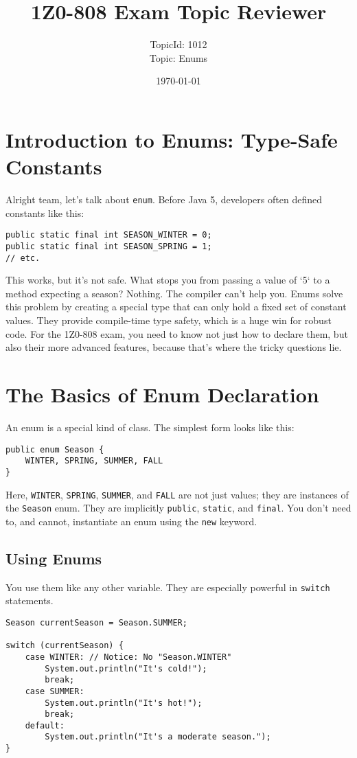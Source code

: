 \documentclass[12pt]{article}
\title{\textbf{1Z0-808 Exam Topic Reviewer}}
\author{TopicId: 1012 \\ Topic: Enums}
\date{\today}
\begin{document}
\maketitle
\newpage\begin{enumerate}[label=(\arabic*)]
\section*{Introduction to Enums: Type-Safe Constants}
Alright team, let's talk about \texttt{enum}. Before Java 5, developers often defined constants like this:
\begin{verbatim}
public static final int SEASON_WINTER = 0;
public static final int SEASON_SPRING = 1;
// etc.
\end{verbatim}
This works, but it's not safe. What stops you from passing a value of `5` to a method expecting a season? Nothing. The compiler can't help you. Enums solve this problem by creating a special type that can only hold a fixed set of constant values. They provide compile-time type safety, which is a huge win for robust code. For the 1Z0-808 exam, you need to know not just how to declare them, but also their more advanced features, because that's where the tricky questions lie.

\section{The Basics of Enum Declaration}
An enum is a special kind of class. The simplest form looks like this:
\begin{verbatim}
public enum Season {
    WINTER, SPRING, SUMMER, FALL
}
\end{verbatim}
Here, \texttt{WINTER}, \texttt{SPRING}, \texttt{SUMMER}, and \texttt{FALL} are not just values; they are instances of the \texttt{Season} enum. They are implicitly \texttt{public}, \texttt{static}, and \texttt{final}. You don't need to, and cannot, instantiate an enum using the \texttt{new} keyword.

\subsection*{Using Enums}
You use them like any other variable. They are especially powerful in \texttt{switch} statements.
\begin{verbatim}
Season currentSeason = Season.SUMMER;

switch (currentSeason) {
    case WINTER: // Notice: No "Season.WINTER"
        System.out.println("It's cold!");
        break;
    case SUMMER:
        System.out.println("It's hot!");
        break;
    default:
        System.out.println("It's a moderate season.");
}
\end{verbatim}


\end{enumerate}
\end{document}
